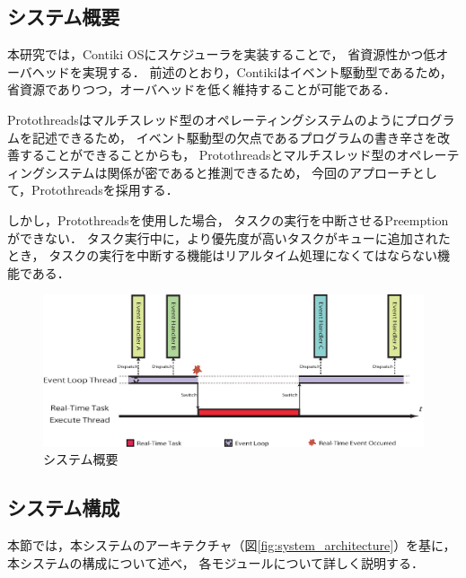 \subsection{システム概要}
本研究では，Contiki OSにスケジューラを実装することで，
省資源性かつ低オーバヘッドを実現する．
前述のとおり，Contikiはイベント駆動型であるため，
省資源でありつつ，オーバヘッドを低く維持することが可能である．

Protothreadsはマルチスレッド型のオペレーティングシステムのようにプログラムを記述できるため，
イベント駆動型の欠点であるプログラムの書き辛さを改善することができることからも，
Protothreadsとマルチスレッド型のオペレーティングシステムは関係が密であると推測できるため，
今回のアプローチとして，Protothreadsを採用する．

しかし，Protothreadsを使用した場合，
タスクの実行を中断させるPreemptionができない．
タスク実行中に，より優先度が高いタスクがキューに追加されたとき，
タスクの実行を中断する機能はリアルタイム処理になくてはならない機能である．


\begin{figure}[htbp]
 \begin{center}
  \includegraphics[width=150mm]{./images/system_overview.eps}
 \end{center}
 \caption{システム概要}
 \label{fig:system_overview}
\end{figure}


\subsection{システム構成}
本節では，本システムのアーキテクチャ（図\ref{fig:system_architecture}）を基に，
本システムの構成について述べ，
各モジュールについて詳しく説明する．


